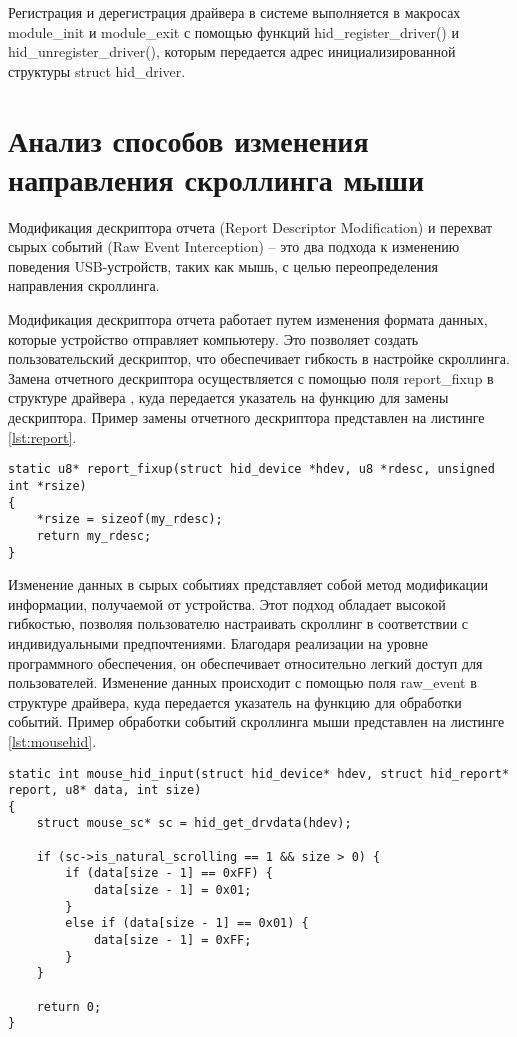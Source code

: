\documentclass{bmstu}
\begin{document}
Регистрация и дерегистрация драйвера в системе выполняется в макросах module\_init и module\_exit 
с помощью функций hid\_register\_driver() и hid\_unregister\_driver(), которым передается адрес инициализированной 
структуры struct hid\_driver.

\section{Анализ способов изменения направления скроллинга мыши}

Модификация дескриптора отчета (Report Descriptor Modification) и перехват сырых событий (Raw Event Interception) -- 
это два подхода к изменению поведения USB-устройств, таких как мышь, с целью переопределения направления скроллинга.

Модификация дескриптора отчета работает путем изменения формата данных, которые устройство отправляет компьютеру. 
Это позволяет создать пользовательский дескриптор, что обеспечивает гибкость в настройке скроллинга.
Замена отчетного дескриптора осуществляется с помощью поля report\_fixup в структуре драйвера \cite{ryazanov2023}, куда передается указатель на
функцию для замены дескриптора. Пример замены отчетного дескриптора представлен на листинге \ref{lst:report}.

\begin{lstlisting}[caption={Функция замены отчетного дескриптора}, label=lst:report]
static u8* report_fixup(struct hid_device *hdev, u8 *rdesc, unsigned int *rsize)
{
    *rsize = sizeof(my_rdesc);
    return my_rdesc;
}
\end{lstlisting}

Изменение данных в сырых событиях представляет собой метод модификации информации, получаемой от 
устройства. Этот подход обладает высокой гибкостью, позволяя пользователю 
настраивать скроллинг в соответствии с индивидуальными предпочтениями. Благодаря реализации на уровне 
программного обеспечения, он обеспечивает относительно легкий доступ для пользователей. Изменение данных происходит
с помощью поля raw\_event в структуре драйвера, куда передается указатель на функцию для обработки событий. Пример обработки
событий скроллинга мыши представлен на листинге \ref{lst:mousehid}.
\clearpage

\begin{lstlisting}[caption={Функция обработки данных от устройства}, label=lst:mousehid]
static int mouse_hid_input(struct hid_device* hdev, struct hid_report* report, u8* data, int size)
{
    struct mouse_sc* sc = hid_get_drvdata(hdev);

    if (sc->is_natural_scrolling == 1 && size > 0) {
        if (data[size - 1] == 0xFF) {
            data[size - 1] = 0x01;
        }
        else if (data[size - 1] == 0x01) {
            data[size - 1] = 0xFF;
        }
    }

    return 0;
}
\end{lstlisting}
\end{document}
